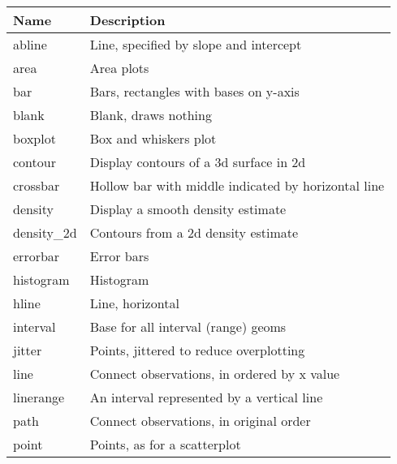\begin{table}
  \begin{center}
 \begin{tabular}{lp{3in}}
  \toprule
  Name & Description \\
  \midrule
  abline       & Line, specified by slope and intercept                                       \\
  area         & Area plots                                                                   \\
  bar          & Bars, rectangles with bases on y-axis                                        \\
  blank        & Blank, draws nothing                                                         \\
  boxplot      & Box and whiskers plot                                                        \\
  contour      & Display contours of a 3d surface in 2d                                       \\
  crossbar     & Hollow bar with middle indicated by horizontal line                          \\
  density      & Display a smooth density estimate                                            \\
  density\_2d & Contours from a 2d density estimate                                          \\
  errorbar     & Error bars                                                                   \\
  histogram    & Histogram                                                                    \\
  hline        & Line, horizontal                                                             \\
  interval     & Base for all interval (range) geoms                                          \\
  jitter       & Points, jittered to reduce overplotting                                      \\
  line         & Connect observations, in ordered by x value                                  \\
  linerange    & An interval represented by a vertical line                                   \\
  path         & Connect observations, in original order                                      \\
  point        & Points, as for a scatterplot                                                 \\

\end{tabular}
\end{center}
\end{table}
